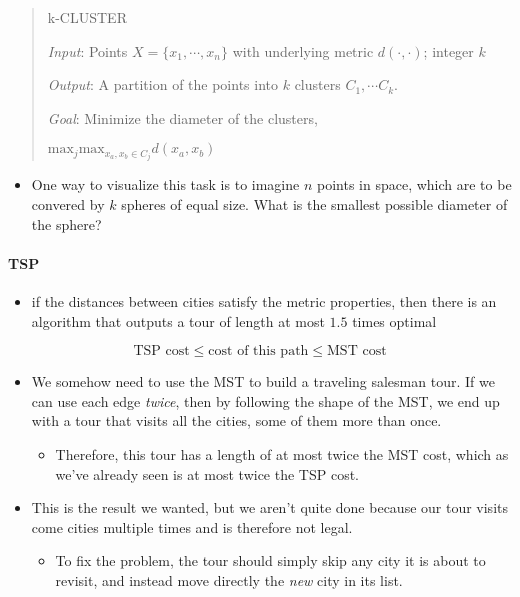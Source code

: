 \documentclass[a4paper,11pt]{article}
\begin{document}
\begin{quote}
k-CLUSTER

\emph{Input}: Points $X = \{ x_1, \cdots, x_n \}$ with underlying metric
$d(\cdot, \cdot)$; integer $k$

\emph{Output}: A partition of the points into $k$ clusters
$C_1, \cdots C_k$.

\emph{Goal}: Minimize the diameter of the clusters,

$\text{max}_j \text{max}_{x_a, x_b \in C_j} d(x_a, x_b)$
\end{quote}

\begin{itemize}
\itemsep1pt\parskip0pt
\item
  One way to visualize this task is to imagine $n$ points in space,
  which are to be convered by $k$ spheres of equal size. What is the
  smallest possible diameter of the sphere?
\end{itemize}

\paragraph{TSP}\label{tsp}

\begin{itemize}
\itemsep1pt\parskip0pt
\item
  if the distances between cities satisfy the metric properties, then
  there is an algorithm that outputs a tour of length at most $1.5$
  times optimal
\end{itemize}

\[\text{TSP cost} \le \text{cost of this path} \le \text{MST cost}\]

\begin{itemize}
\itemsep1pt\parskip0pt
\item
  We somehow need to use the MST to build a traveling salesman tour. If
  we can use each edge \emph{twice}, then by following the shape of the
  MST, we end up with a tour that visits all the cities, some of them
  more than once.

  \begin{itemize}
  \itemsep1pt\parskip0pt
  \item
    Therefore, this tour has a length of at most twice the MST cost,
    which as we've already seen is at most twice the TSP cost.
  \end{itemize}
\item
  This is the result we wanted, but we aren't quite done because our
  tour visits come cities multiple times and is therefore not legal.

  \begin{itemize}
  \itemsep1pt\parskip0pt
  \item
    To fix the problem, the tour should simply skip any city it is about
    to revisit, and instead move directly the \emph{new} city in its
    list.
  \end{itemize}
\end{itemize}
\end{document}

